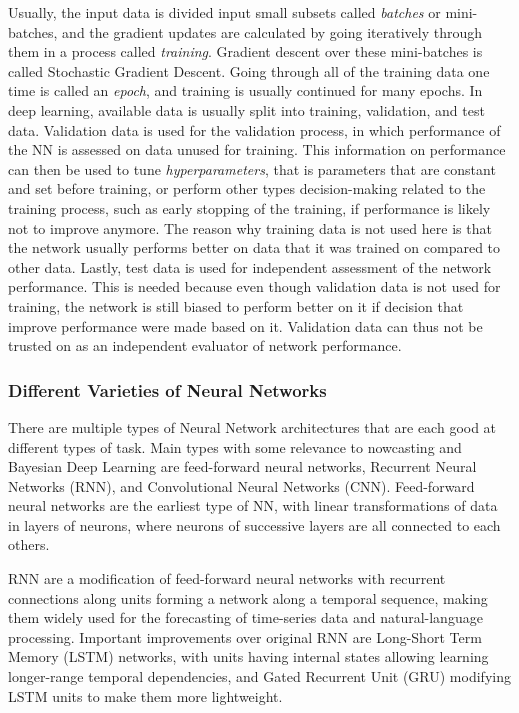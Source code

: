Usually, the input data is divided input small subsets called \textit{batches} or mini-batches, and the gradient updates are calculated by going iteratively through them in a process called \textit{training}. Gradient descent over these mini-batches is called Stochastic Gradient Descent. Going through all of the training data one time is called an \textit{epoch}, and training is usually continued for many epochs. In deep learning, available data is usually split into training, validation, and test data. Validation data is used for the validation process, in which performance of the NN is assessed on data unused for training. This information on performance can then be used to tune \textit{hyperparameters}, that is parameters that are constant and set before training, or perform other types decision-making related to the training process, such as early stopping of the training, if performance is likely not to improve anymore. The reason why training data is not used here is that the network usually performs better on data that it was trained on compared to other data. Lastly, test data is used for independent assessment of the network performance. This is needed because even though validation data is not used for training, the network is still biased to perform better on it if decision that improve performance were made based on it. Validation data can thus not be trusted on as an independent evaluator of network performance. 

\subsubsection*{Different Varieties of Neural Networks}
There are multiple types of Neural Network architectures that are each good at different types of task. Main types with some relevance to nowcasting and Bayesian Deep Learning are feed-forward neural networks, Recurrent Neural Networks (RNN), and Convolutional Neural Networks (CNN). Feed-forward neural networks are the earliest type of NN, with linear transformations of data in layers of neurons, where neurons of successive layers are all connected to each others.

 RNN are a modification of feed-forward neural networks with recurrent connections along units forming a network along a temporal sequence, making them widely used for the forecasting of time-series data and natural-language processing. Important improvements over original RNN are Long-Short Term Memory (LSTM) networks, with units having internal states allowing learning longer-range temporal dependencies, and Gated Recurrent Unit (GRU) modifying LSTM units to make them more lightweight. 

